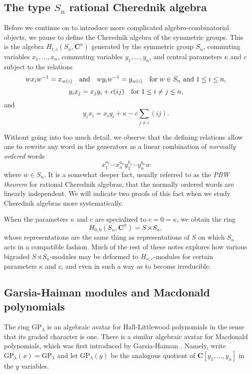 \documentclass[12pt, reqno]{amsart}
\numberwithin{equation}{section}
\theoremstyle{definition}
\theoremstyle{plain}
\newcommand{\CC}{\mathbf{C}}
\begin{document}
\subsection{The type $S_n$ rational Cherednik algebra} Before we continue on to introduce more complicated algebro-combinatorial objects, we pause to define the Cherednik algebra of the symmetric groups. This is the algebra $H_{t,c}(S_n,\CC^n)$ generated by the symmetric group $S_n$, commuting variables $x_1,\dots,x_n$, commuting variables $y_1,\dots,y_n$, and central parameters $\kappa$ and $c$ subject to the relations
$$w x_i w^{-1}=x_{w(i)} \quad \text{and} \quad w y_i w^{-1}=y_{w(i)} \quad \hbox{for $w \in S_n$ and $1 \leq i \leq n$,}$$ 
$$y_i x_j=x_j y_i+c(ij) \quad \hbox{for $1 \leq i \neq j \leq n$,}$$ and
$$y_i x_i=x_i y_i+\kappa-c \sum_{j \neq i} (ij).$$ 

Without going into too much detail, we observe that the defining relations allow one to rewrite any word in the generators as a linear combination of \emph{normally ordered} words 
$$x_1^{a_1} \cdots x_n^{a_n} y_1^{b_1} \cdots y_n^{b_n} w$$ where $w \in S_n$. It is a somewhat deeper fact, usually referred to as the \emph{PBW theorem} for rational Cherednik algebras, that the normally ordered words are linearly independent. We will indicate two proofs of this fact when we study Cherednik algebras more systematically.

When the parameters $\kappa$ and $c$ are specialized to $c=0=\kappa$, we obtain the ring 
$$H_{0,0}(S_n,\CC^n)=S\rtimes S_n,$$ whose representations are the same thing as representations of $S$ on which $S_n$ acts in a compatible fashion. Much of the rest of these notes explores how various bigraded $S \rtimes S_n$-modules may be deformed to $H_{\kappa,c}$-modules for certain parameters $\kappa$ and $c$, and even in such a way as to become irreducible.

\subsection{Garsia-Haiman modules and Macdonald polynomials} The ring $\mathrm{GP}_\lambda$ is an algebraic avatar for Hall-Littlewood polynomials in the sense that its graded character is one. There is a similar algebraic avatar for Macdonald polynomials, which was first introduced by Garsia-Haiman \cite{GaHa}. Namely, write $\mathrm{GP}_\lambda(x)=\mathrm{GP}_\lambda$ and let $\mathrm{GP}_\lambda(y)$ be the analogous quotient of $\CC[y_1,\dots,y_n]$ in the $y$ variables. 
\end{document}

